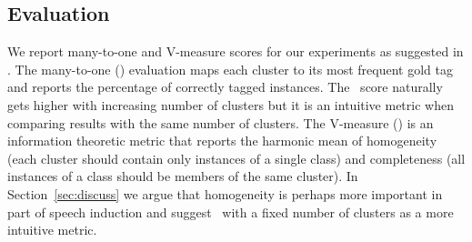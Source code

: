 \subsection{Evaluation}

We report many-to-one and V-measure scores for our experiments as
suggested in \cite{Christodoulopoulos:2010:TDU:1870658.1870714}.  The
many-to-one (\mto) evaluation maps each cluster to its most frequent
gold tag and reports the percentage of correctly tagged instances.
The \mto\ score naturally gets higher with increasing number of
clusters but it is an intuitive metric when comparing results with the
same number of clusters.  The V-measure (\vm) \cite{rosenberg2007v} is
an information theoretic metric that reports the harmonic mean of
homogeneity (each cluster should contain only instances of a single
class) and completeness (all instances of a class should be members of
the same cluster).  In Section~\ref{sec:discuss} we argue that
homogeneity is perhaps more important in part of speech induction and
suggest \mto\ with a fixed number of clusters as a more intuitive
metric.

